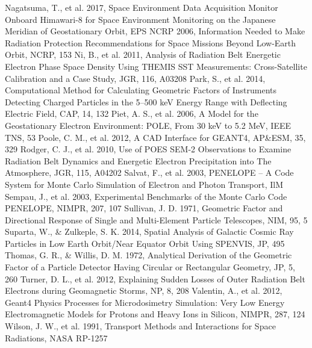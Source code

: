 \documentclass{jkas}
\begin{document}
\begin{thebibliography}{}
 Nagatsuma, T., et al. 2017, Space Environment Data Acquisition Monitor Onboard Himawari-8 for Space Environment Monitoring on the Japanese Meridian of Geostationary Orbit, EPS
 NCRP 2006, Information Needed to Make Radiation Protection Recommendations for Space Missions Beyond Low-Earth Orbit, NCRP, 153
 Ni, B., et al. 2011, Analysis of Radiation Belt Energetic Electron Phase Space Density Using THEMIS SST Measurements: Cross-Satellite Calibration and a Case Study, JGR, 116, A03208
 Park, S., et al. 2014, Computational Method for Calculating Geometric Factors of Instruments Detecting Charged Particles in the 5--500 keV Energy Range with Deflecting Electric Field, CAP, 14, 132
 Piet, A. S., et al. 2006, A Model for the Geostationary Electron Environment: POLE, From 30 keV to 5.2 MeV, IEEE TNS, 53
 Poole, C. M., et al. 2012, A CAD Interface for GEANT4, AP\&ESM, 35, 329
 Rodger, C. J., et al. 2010, Use of POES SEM-2 Observations to Examine Radiation Belt Dynamics and Energetic Electron Precipitation into The Atmosphere, JGR, 115, A04202
 Salvat, F., et al. 2003, PENELOPE -- A Code System for Monte Carlo Simulation of Electron and Photon Transport, IlM
 Sempau, J., et al. 2003, Experimental Benchmarks of the Monte Carlo Code PENELOPE, NIMPR, 207, 107
 Sullivan, J. D. 1971, Geometric Factor and Directional Response of Single and Multi-Element Particle Telescopes, NIM, 95, 5
 Suparta, W., \& Zulkeple, S. K. 2014, Spatial Analysis of Galactic Cosmic Ray Particles in Low Earth Orbit/Near Equator Orbit Using SPENVIS, JP, 495
 Thomas, G. R., \& Willis, D. M. 1972, Analytical Derivation of the Geometric Factor of a Particle Detector Having Circular or Rectangular Geometry, JP, 5, 260
 Turner, D. L., et al. 2012, Explaining Sudden Losses of Outer Radiation Belt Electrons during Geomagnetic Storms, NP, 8, 208
 Valentin, A., et al. 2012, Geant4 Physics Processes for Microdosimetry Simulation: Very Low Energy Electromagnetic Models for Protons and Heavy Ions in Silicon, NIMPR, 287, 124
 Wilson, J. W., et al. 1991, Transport Methods and Interactions for Space Radiations, NASA RP-1257

\end{thebibliography}
\end{document}
